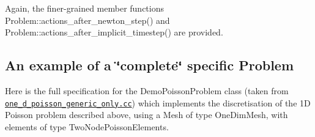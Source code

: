 Again, the finer-\/grained member functions {\ttfamily Problem\+::actions\+\_\+after\+\_\+newton\+\_\+step()} and {\ttfamily Problem\+::actions\+\_\+after\+\_\+implicit\+\_\+timestep()} are provided.



\hypertarget{index_full}{}\subsection{An example of a \char`\"{}complete\char`\"{} specific Problem}\label{index_full}
Here is the full specification for the {\ttfamily Demo\+Poisson\+Problem} class (taken from \href{../../../demo_drivers/poisson/one_d_poisson_generic_only/one_d_poisson_generic_only.cc}{\tt one\+\_\+d\+\_\+poisson\+\_\+generic\+\_\+only.\+cc}) which implements the discretisation of the 1D Poisson problem described above, using a {\ttfamily Mesh} of type {\ttfamily One\+Dim\+Mesh}, with elements of type {\ttfamily Two\+Node\+Poisson\+Elements}.

